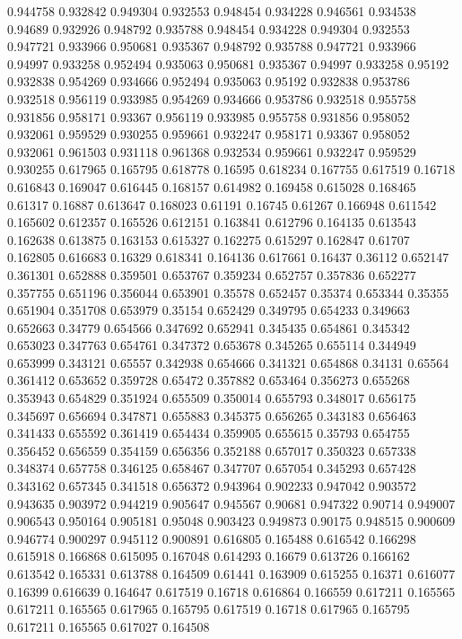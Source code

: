 0.944758 0.932842
0.949304 0.932553
0.948454 0.934228
0.946561 0.934538
0.94689 0.932926
0.948792 0.935788
0.948454 0.934228
0.949304 0.932553
0.947721 0.933966
0.950681 0.935367
0.948792 0.935788
0.947721 0.933966
0.94997 0.933258
0.952494 0.935063
0.950681 0.935367
0.94997 0.933258
0.95192 0.932838
0.954269 0.934666
0.952494 0.935063
0.95192 0.932838
0.953786 0.932518
0.956119 0.933985
0.954269 0.934666
0.953786 0.932518
0.955758 0.931856
0.958171 0.93367
0.956119 0.933985
0.955758 0.931856
0.958052 0.932061
0.959529 0.930255
0.959661 0.932247
0.958171 0.93367
0.958052 0.932061
0.961503 0.931118
0.961368 0.932534
0.959661 0.932247
0.959529 0.930255
0.617965 0.165795
0.618778 0.16595
0.618234 0.167755
0.617519 0.16718
0.616843 0.169047
0.616445 0.168157
0.614982 0.169458
0.615028 0.168465
0.61317 0.16887
0.613647 0.168023
0.61191 0.16745
0.61267 0.166948
0.611542 0.165602
0.612357 0.165526
0.612151 0.163841
0.612796 0.164135
0.613543 0.162638
0.613875 0.163153
0.615327 0.162275
0.615297 0.162847
0.61707 0.162805
0.616683 0.16329
0.618341 0.164136
0.617661 0.16437
0.36112 0.652147
0.361301 0.652888
0.359501 0.653767
0.359234 0.652757
0.357836 0.652277
0.357755 0.651196
0.356044 0.653901
0.35578 0.652457
0.35374 0.653344
0.35355 0.651904
0.351708 0.653979
0.35154 0.652429
0.349795 0.654233
0.349663 0.652663
0.34779 0.654566
0.347692 0.652941
0.345435 0.654861
0.345342 0.653023
0.347763 0.654761
0.347372 0.653678
0.345265 0.655114
0.344949 0.653999
0.343121 0.65557
0.342938 0.654666
0.341321 0.654868
0.34131 0.65564
0.361412 0.653652
0.359728 0.65472
0.357882 0.653464
0.356273 0.655268
0.353943 0.654829
0.351924 0.655509
0.350014 0.655793
0.348017 0.656175
0.345697 0.656694
0.347871 0.655883
0.345375 0.656265
0.343183 0.656463
0.341433 0.655592
0.361419 0.654434
0.359905 0.655615
0.35793 0.654755
0.356452 0.656559
0.354159 0.656356
0.352188 0.657017
0.350323 0.657338
0.348374 0.657758
0.346125 0.658467
0.347707 0.657054
0.345293 0.657428
0.343162 0.657345
0.341518 0.656372
0.943964 0.902233
0.947042 0.903572
0.943635 0.903972
0.944219 0.905647
0.945567 0.90681
0.947322 0.90714
0.949007 0.906543
0.950164 0.905181
0.95048 0.903423
0.949873 0.90175
0.948515 0.900609
0.946774 0.900297
0.945112 0.900891
0.616805 0.165488
0.616542 0.166298
0.615918 0.166868
0.615095 0.167048
0.614293 0.16679
0.613726 0.166162
0.613542 0.165331
0.613788 0.164509
0.61441 0.163909
0.615255 0.16371
0.616077 0.16399
0.616639 0.164647
0.617519 0.16718
0.616864 0.166559
0.617211 0.165565
0.617211 0.165565
0.617965 0.165795
0.617519 0.16718
0.617965 0.165795
0.617211 0.165565
0.617027 0.164508
